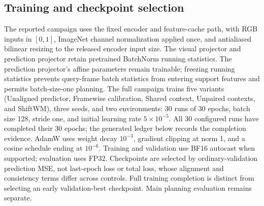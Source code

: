 \subsection{Training and checkpoint selection}
The reported campaign uses the fixed encoder and feature-cache path, with
RGB inputs in $[0,1]$, ImageNet channel normalization applied once, and
antialiased bilinear resizing to the released encoder input size. The visual
projector and prediction projector retain pretrained BatchNorm running
statistics. The prediction projector's affine parameters remain trainable;
freezing running statistics prevents query-frame batch statistics from
entering support features and permits batch-size-one planning.
The full campaign trains five variants (Unaligned predictor, Framewise
calibration, Shared context, Unpaired contexts, and ShiftWM), three seeds,
and two environments:
30 runs of 30 epochs,
batch size 128, stride one, and initial learning rate $5\times10^{-5}$.
All 30 configured runs have completed their 30 epochs; the generated ledger
below records the completion evidence. AdamW uses weight decay $10^{-3}$,
gradient clipping at norm 1, and a cosine schedule ending at $10^{-6}$.
Training and validation use BF16 autocast when supported; evaluation uses
FP32. Checkpoints are selected by ordinary-validation prediction MSE, not
last-epoch loss or total loss, whose alignment and consistency terms differ
across controls. Full training completion is distinct from selecting an early
validation-best checkpoint. Main planning evaluation remains separate.


